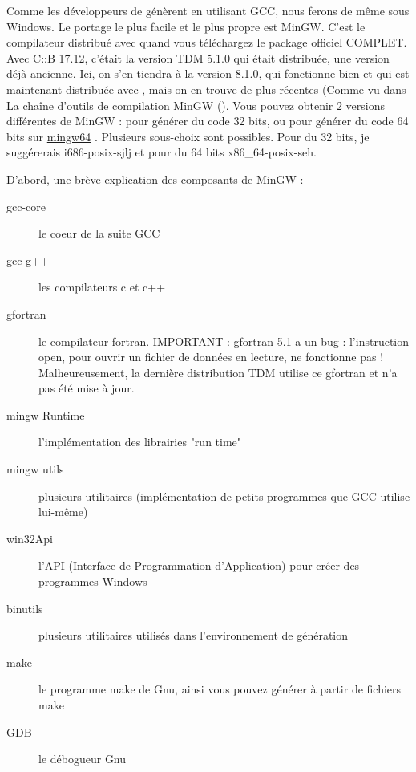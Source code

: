 Comme les développeurs de \codeblocks génèrent \codeblocks en utilisant GCC, nous ferons de même sous Windows. Le portage le plus facile et le plus propre est MinGW. C'est le compilateur distribué avec \codeblocks quand vous téléchargez le package officiel COMPLET. Avec C::B 17.12, c'était la version TDM 5.1.0 qui était distribuée, une version déjà ancienne. Ici, on s'en tiendra à la version 8.1.0, qui fonctionne bien et qui est maintenant distribuée avec , mais on en trouve de plus récentes (Comme vu dans La chaîne d'outils de compilation MinGW (). Vous pouvez obtenir 2 versions différentes de MinGW : pour générer du code 32 bits, ou pour générer du code 64 bits sur \href{https://sourceforge.net/projects/mingw-w64/files/}{mingw64} \cite{url:mingw64}. Plusieurs sous-choix sont possibles. Pour du 32 bits, je suggérerais i686-posix-sjlj et pour du 64 bits x86\_64-posix-seh.


D'abord, une brève explication des composants de MinGW :

\begin{description}
\item[gcc-core] le coeur de la suite GCC
\item[gcc-g++] les compilateurs c et c++
\item[gfortran] le compilateur fortran. IMPORTANT : gfortran 5.1 a un bug : l'instruction open, pour ouvrir un fichier de données en lecture, ne fonctionne pas ! Malheureusement, la dernière distribution TDM utilise ce gfortran et n'a pas été mise à jour.
\item[mingw Runtime] l'implémentation des librairies "run time"
\item[mingw utils] plusieurs utilitaires (implémentation de petits programmes que GCC utilise lui-même)
\item[win32Api] l'API (Interface de Programmation d'Application) pour créer des programmes Windows
\item[binutils] plusieurs utilitaires utilisés dans l'environnement de génération
\item[make] le programme make de Gnu, ainsi vous pouvez générer à partir de fichiers make
\item[GDB] le débogueur Gnu
\end{description}

